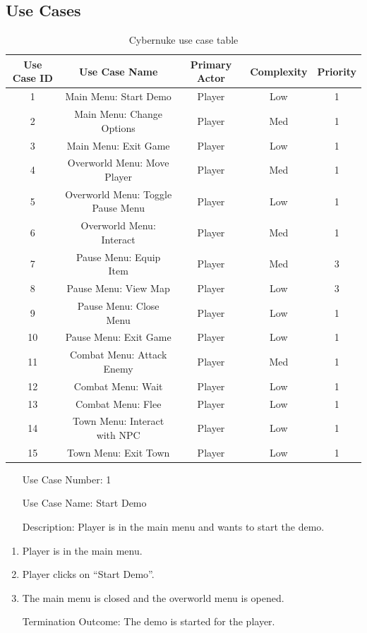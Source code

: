 \documentclass[10pt,conference,onecolumn,compsoc]{IEEEtran}
\begin{document}
\subsection{Use Cases}
\begin{table}
\centering
\begin{tabular}{|c|c|c|c|c|}
\hline
Use Case ID & Use Case Name & Primary Actor & Complexity & Priority \\
\hline \hline
1 & Main Menu: Start Demo & Player & Low & 1\\
\hline
2 & Main Menu: Change Options & Player & Med & 1\\
\hline
3 & Main Menu: Exit Game & Player & Low & 1\\
\hline
4 & Overworld Menu: Move Player & Player & Med & 1\\
\hline
5 & Overworld Menu: Toggle Pause Menu & Player & Low & 1\\
\hline
6 & Overworld Menu: Interact & Player & Med & 1\\
\hline
7 & Pause Menu: Equip Item & Player & Med & 3\\
\hline
8 & Pause Menu: View Map & Player & Low & 3\\
\hline
9 & Pause Menu: Close Menu & Player & Low & 1\\
\hline
10 & Pause Menu: Exit Game & Player & Low & 1\\
\hline
11 & Combat Menu: Attack Enemy & Player & Med & 1\\
\hline
12 & Combat Menu: Wait & Player & Low & 1\\
\hline
13 & Combat Menu: Flee & Player & Low & 1\\
\hline
14 & Town Menu: Interact with NPC & Player & Low & 1\\
\hline
15 & Town Menu: Exit Town & Player & Low & 1\\
\hline

\end{tabular}
\caption{Cybernuke use case table}
\label{tab:useCaseIndex}
\end{table}


\begin{itemize}
\item[Use Case Number:] 1
\item[Use Case Name:] Start Demo
\item[Description:] Player is in the main menu and wants to start the demo.
\end{itemize}
\begin{enumerate}
\item Player is in the main menu.
\item Player clicks on “Start Demo”.
\item The main menu is closed and the overworld menu is opened.
\item[Termination Outcome:] The demo is started for the player.
\end{enumerate}
\end{document}
